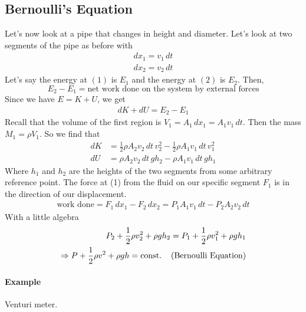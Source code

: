 \documentclass{report}
\numberwithin{equation}{section}
\begin{document}
\subsection{Bernoulli's Equation}
Let's now look at a pipe that changes in height and diameter. Let's look at two segments
of the pipe as before with
\begin{align*}
    dx_1 = v_1\, dt\\
    dx_2 = v_2\, dt
\end{align*}
Let's say the energy at $(1)$ is $E_1$ and the energy at $(2)$ is $E_2$. Then,
\begin{equation}
        E_2 - E_1 = \text{net work done on the system by external forces}
\end{equation}
Since we have $E = K + U$, we get
\begin{align*}
    dK + dU = E_2 - E_1
\end{align*}
Recall that the volume of the first region is $V_1 = A_1\, dx_1 = A_1 v_1\, dt$. Then the mass
$M_1 = \rho V_1$. So we find that
\begin{align*}
    dK &= \frac{1}{2}\rho A_2 v_2\, dt\, v_2^2 - \frac{1}{2} \rho A_1 v_1\, dt\, v_1^2\\
    dU &= \rho A_2 v_2\, dt\, g h_2 - \rho A_1 v_1\, dt\, g h_1
\end{align*}
Where $h_1$ and $h_2$ are the heights of the two segments from some arbitrary reference point. The force at
(1) from the fluid on our specific segment $F_1$ is in the direction of our displacement.
\begin{align*}
    \text{work done} = F_1\, dx_1 - F_2\, dx_2 = P_1 A_1 v_1\, dt - P_2 A_2 v_2\, dt
\end{align*}
With a little algebra
\begin{align}
    \begin{split}
            P_2 + \frac{1}{2}\rho v_2^2 + \rho gh_2 = P_1 + \frac{1}{2}\rho v_1^2 +  \rho g h_1\\
            \Rightarrow P + \frac{1}{2}\rho v^2 + \rho g h = \text{const.}\hspace{0.4cm}\text{(Bernoulli Equation)}
    \end{split}
\end{align}
\paragraph{Example} Venturi meter.
\end{document}
